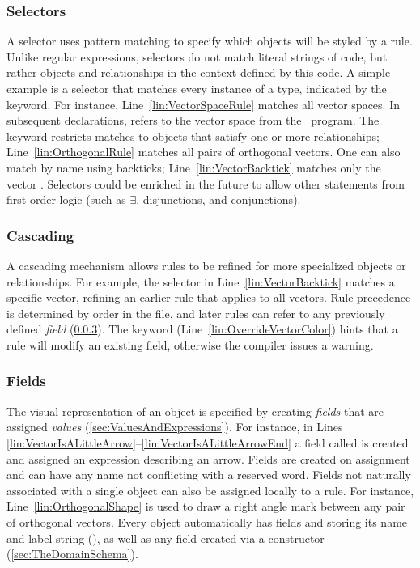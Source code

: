 \subsubsection{Selectors}
\label{sec:Selectors}

A selector uses pattern matching to specify which objects will be styled by a rule.  Unlike regular expressions, selectors do not match literal strings of \Substance{} code, but rather objects and relationships in the context defined by this code.  A simple example is a selector that matches every instance of a type, indicated by the  keyword.  For instance, Line~\ref{lin:VectorSpaceRule} matches all vector spaces.  In subsequent declarations,  refers to the vector space  from the \Substance\ program.  The  keyword restricts matches to objects that satisfy one or more relationships; \eg Line~\ref{lin:OrthogonalRule} matches all pairs of orthogonal vectors.  One can also match by name using backticks; \eg Line~\ref{lin:VectorBacktick} matches only the vector .  Selectors could be enriched in the future to allow other statements from first-order logic (such as \(\exists\), disjunctions, and conjunctions).

\subsubsection{Cascading}
\label{sec:Cascading}

A cascading mechanism allows rules to be refined for more specialized objects or relationships.  For example, the selector in Line~\ref{lin:VectorBacktick} matches a specific vector, refining an earlier rule that applies to all vectors.  Rule precedence is determined by order in the \Style{} file, and later rules can refer to any previously defined \emph{field} (\cref{sec:Fields}).  The  keyword (Line~\ref{lin:OverrideVectorColor}) hints that a rule will modify an existing field, otherwise the compiler issues a warning.


\subsubsection{Fields}
\label{sec:Fields}

The visual representation of an object is specified by creating \emph{fields} that are assigned \emph{values} (\cref{sec:ValuesAndExpressions}).  For instance, in Lines \ref{lin:VectorIsALittleArrow}--\ref{lin:VectorIsALittleArrowEnd} a field called  is created and assigned an expression describing an arrow.  Fields are created on assignment and can have any name not conflicting with a reserved word.  Fields not naturally associated with a single object can also be assigned locally to a rule. For instance, Line~\ref{lin:OrthogonalShape} is used to draw a right angle mark between any pair of orthogonal vectors.  Every object automatically has fields  and  storing its \Substance{} name and label string (\resp), as well as any field created via a constructor (\cref{sec:TheDomainSchema}).


